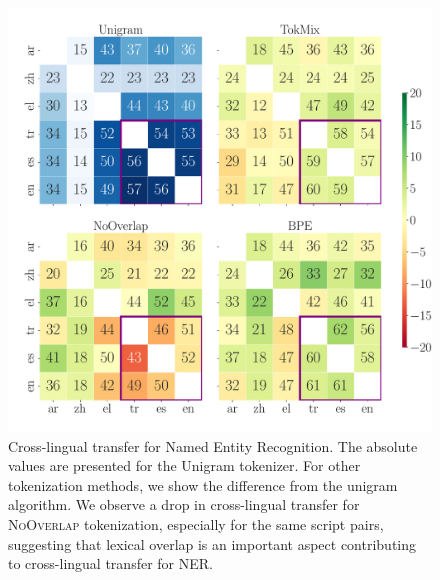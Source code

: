 \begin{figure}[tb!]
    \centering
    \includegraphics[width=1.0\linewidth]{figures/NER_F1_transfer_.pdf}
    
    \caption{Cross-lingual transfer for Named Entity Recognition. The absolute values are presented for the Unigram tokenizer. For other tokenization methods, we show  the difference from the unigram algorithm. We observe a drop in cross-lingual transfer for \textsc{NoOverlap} tokenization, especially for the same script pairs, suggesting that lexical overlap is an important aspect contributing to cross-lingual transfer for NER.}
    \label{fig:ner_transfer}
\end{figure}